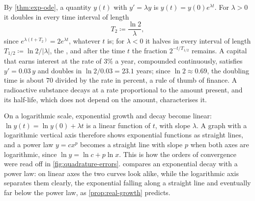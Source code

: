 By \cref{thm:exp-ode}, a quantity $y(t)$ with $y'=\lambda y$ is $y(t)=y(0)e^{\lambda t}$. For $\lambda>0$ it doubles in every time interval of length
\[
T_2\coloneqq\frac{\ln2}\lambda ,
\]
since $e^{\lambda(t+T_2)}=2e^{\lambda t}$, whatever $t$ is; for $\lambda<0$ it halves in every interval of length $T_{1/2}\coloneqq\ln2/|\lambda|$, the , and after the time $t$ the fraction $2^{-t/T_{1/2}}$ remains. A capital that earns interest at the rate of $3\%$ a year, compounded continuously, satisfies $y'=0.03\,y$ and doubles in $\ln2/0.03=23.1$ years; since $\ln2\approx0.69$, the doubling time is about $70$ divided by the rate in percent, a rule of thumb of finance. A radioactive substance decays at a rate proportional to the amount present, and its half-life, which does not depend on the amount, characterises it.

On a logarithmic scale, exponential growth and decay become linear: $\ln y(t)=\ln y(0)+\lambda t$ is a linear function of $t$, with slope $\lambda$. A graph with a logarithmic vertical axis therefore shows exponential functions as straight lines, and a power law $y=cx^p$ becomes a straight line with slope $p$ when both axes are logarithmic, since $\ln y=\ln c+p\ln x$. This is how the orders of convergence were read off in \cref{fig:quadrature-errors}.  compares an exponential decay with a power law: on linear axes the two curves look alike, while the logarithmic axis separates them clearly, the exponential falling along a straight line and eventually far below the power law, as \cref{prop:real-growth} predicts.

